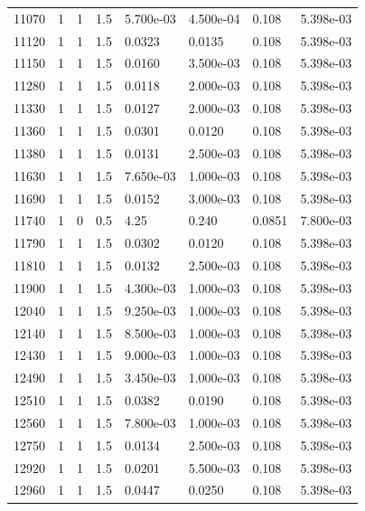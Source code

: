 \documentclass[preview]{standalone}
\begin{document}
{{{{{{\begin{tabular}{L{1.2cm}C{1.2cm} C{0.3cm}C{0.5cm} C{1.4cm}C{1.4cm} C{1.4cm}C{1.4cm}}
  11070  &     1  & 1     & 1.5 &  5.700e-03  & 4.500e-04  & 0.108 &  5.398e-03   \\ 
  11120  &     1  & 1     & 1.5 &  0.0323  & 0.0135  & 0.108 &  5.398e-03   \\ 
  11150  &     1  & 1     & 1.5 &  0.0160  & 3.500e-03  & 0.108 &  5.398e-03   \\ 
  11280  &     1  & 1     & 1.5 &  0.0118  & 2.000e-03  & 0.108 &  5.398e-03   \\ 
  11330  &     1  & 1     & 1.5 &  0.0127  & 2.000e-03  & 0.108 &  5.398e-03   \\ 
  11360  &     1  & 1     & 1.5 &  0.0301  & 0.0120  & 0.108 &  5.398e-03   \\ 
  11380  &     1  & 1     & 1.5 &  0.0131  & 2.500e-03  & 0.108 &  5.398e-03   \\ 
  11630  &     1  & 1     & 1.5 &  7.650e-03  & 1.000e-03  & 0.108 &  5.398e-03   \\ 
  11690  &     1  & 1     & 1.5 &  0.0152  & 3.000e-03  & 0.108 &  5.398e-03   \\ 
  11740  &     1  & 0     & 0.5 &  4.25  & 0.240  & 0.0851 &  7.800e-03   \\ 
  11790  &     1  & 1     & 1.5 &  0.0302  & 0.0120  & 0.108 &  5.398e-03   \\ 
  11810  &     1  & 1     & 1.5 &  0.0132  & 2.500e-03  & 0.108 &  5.398e-03   \\ 
  11900  &     1  & 1     & 1.5 &  4.300e-03  & 1.000e-03  & 0.108 &  5.398e-03   \\ 
  12040  &     1  & 1     & 1.5 &  9.250e-03  & 1.000e-03  & 0.108 &  5.398e-03   \\ 
  12140  &     1  & 1     & 1.5 &  8.500e-03  & 1.000e-03  & 0.108 &  5.398e-03   \\ 
  12430  &     1  & 1     & 1.5 &  9.000e-03  & 1.000e-03  & 0.108 &  5.398e-03   \\ 
  12490  &     1  & 1     & 1.5 &  3.450e-03  & 1.000e-03  & 0.108 &  5.398e-03   \\ 
  12510  &     1  & 1     & 1.5 &  0.0382  & 0.0190  & 0.108 &  5.398e-03   \\ 
  12560  &     1  & 1     & 1.5 &  7.800e-03  & 1.000e-03  & 0.108 &  5.398e-03   \\ 
  12750  &     1  & 1     & 1.5 &  0.0134  & 2.500e-03  & 0.108 &  5.398e-03   \\ 
  12920  &     1  & 1     & 1.5 &  0.0201  & 5.500e-03  & 0.108 &  5.398e-03   \\ 
  12960  &     1  & 1     & 1.5 &  0.0447  & 0.0250  & 0.108 &  5.398e-03   \\ 

\end{tabular}}}}}}}
\end{document}
